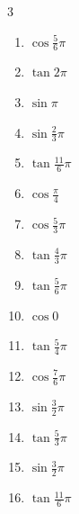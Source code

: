 \begin{multicols}{3}
\begin{enumerate}
  \item $\displaystyle \cos{\frac{5}{6}\pi}$

  \item $\displaystyle \tan{2\pi}$
        \phantom{$\displaystyle =0$}

  \item $\displaystyle \sin{\pi}$
        \phantom{$\displaystyle =0$}

  \item $\displaystyle \sin{\frac{2}{3}\pi}$

  \item $\displaystyle \tan{\frac{11}{6}\pi}$

  \item $\displaystyle \cos{\frac{\pi}{4}}$

  \item $\displaystyle \cos{\frac{5}{3}\pi}$

  \item $\displaystyle \tan{\frac{4}{3}\pi}$

  \item $\displaystyle \tan{\frac{5}{6}\pi}$

  \item $\displaystyle \cos{0}$
        \phantom{$\displaystyle =1$}

  \item $\displaystyle \tan{\frac{5}{4}\pi}$
        \phantom{$\displaystyle =1$}

  \item $\displaystyle \cos{\frac{7}{6}\pi}$

  \item $\displaystyle \sin{\frac{3}{2}\pi}$
        \phantom{$\displaystyle =-1$}

  \item $\displaystyle \tan{\frac{5}{3}\pi}$

  \item $\displaystyle \sin{\frac{3}{2}\pi}$
        \phantom{$\displaystyle =-1$}

  \item $\displaystyle \tan{\frac{11}{6}\pi}$


\end{enumerate}
\end{multicols}
